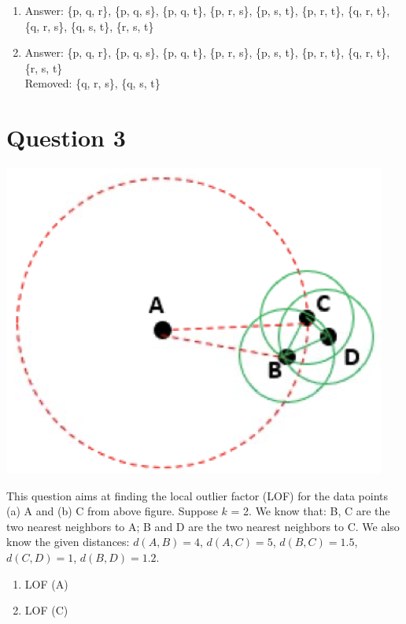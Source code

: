 \documentclass{article}
\begin{document}
\begin{enumerate}[label=(\alph*)]
    \item Answer: \{p, q, r\}, \{p, q, s\}, \{p, q, t\}, \{p, r, s\}, \{p, s, t\}, \{p, r, t\}, \{q, r, t\}, \{q, r, s\}, \{q, s, t\}, \{r, s, t\}
    \item Answer: \{p, q, r\}, \{p, q, s\}, \{p, q, t\}, \{p, r, s\}, \{p, s, t\}, \{p, r, t\}, \{q, r, t\}, \{r, s, t\}
    \\Removed: \{q, r, s\}, \{q, s, t\}
\end{enumerate}

\section*{Question 3}

\begin{center}
    \includegraphics[scale=.75]{chart.png}
\end{center}

\noindent
This question aims at finding the local outlier factor (LOF) for the data points (a) A and (b) C from above figure. Suppose $k$ = 2. We know that: B, C are the two nearest neighbors to A; B and D are the two nearest neighbors to C. We also know the given distances: $d(A, B) = 4$, $d(A, C) = 5$, $d(B, C) = 1.5$, $d(C, D) = 1$, $d(B, D) = 1.2$.

\begin{enumerate}[label=(\alph*)]
    \item LOF (A)
    \item LOF (C)
\end{enumerate}



\end{document}
